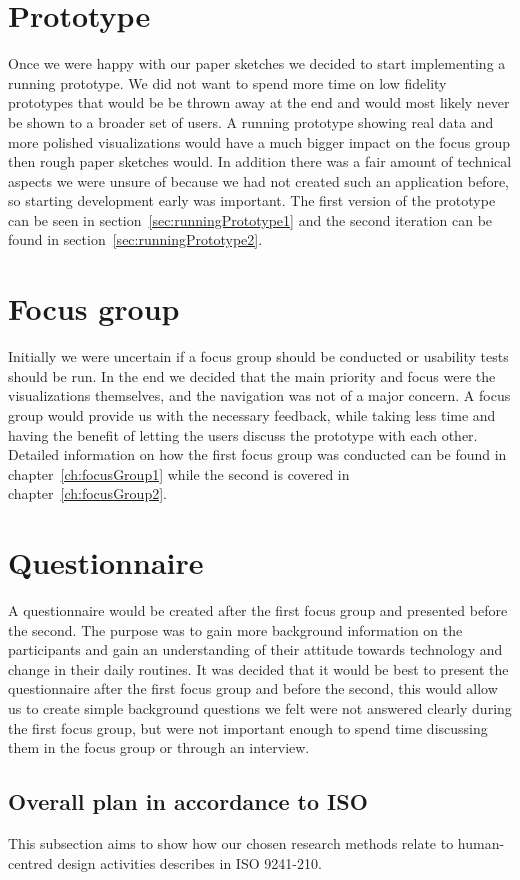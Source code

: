 \section{Prototype}
Once we were happy with our paper sketches we decided to start implementing a running prototype. We did not want to spend more time on low fidelity prototypes that would be be thrown away at the end and would most likely never be shown to a broader set of users. A running prototype showing real data and more polished visualizations would have a much bigger impact on the focus group then rough paper sketches would. In addition there was a fair amount of technical aspects we were unsure of because we had not created such an application before, so starting development early was important. The first version of the prototype can be seen in section~\ref{sec:runningPrototype1} and the second iteration can be found in section~\ref{sec:runningPrototype2}.

\section{Focus group}
Initially we were uncertain if a focus group should be conducted or usability tests should be run. In the end we decided that the main priority and focus were the visualizations themselves, and the navigation was not of a major concern. A focus group would provide us with the necessary feedback, while taking less time and having the benefit of letting the users discuss the prototype with each other. Detailed information on how the first focus group was conducted can be found in chapter~\ref{ch:focusGroup1} while the second is covered in chapter~\ref{ch:focusGroup2}.

\section{Questionnaire}
A questionnaire would be created after the first focus group and presented before the second. The purpose was to gain more background information on the participants and gain an understanding of their attitude towards technology and change in their daily routines.
It was decided that it would be best to present the questionnaire after the first focus group and before the second, this would allow us to create simple background questions we felt were not answered clearly during the first focus group, but were not important enough to spend time discussing them in the focus group or through an interview.

\subsection{Overall plan in accordance to ISO}
This subsection aims to show how our chosen research methods relate to human-centred design activities describes in ISO 9241-210.

